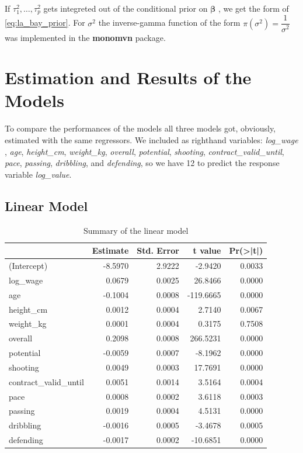 \documentclass[12pt,a4paper]{article}
\begin{document}
If \(\tau^2_1 , \ldots , \tau^2_p\) gets integreted out of the
conditional prior on \(\pmb{\beta}\) , we get the form of
\eqref{eq:la_bay_prior}. For \(\sigma^2\) the inverse-gamma function of
the form \(\pi \left( \sigma^2 \right) = \dfrac{1}{\sigma^2}\) was
implemented in the \textbf{monomvn} package.

\newpage

\hypertarget{estimation-and-results-of-the-models}{%
\section{Estimation and Results of the
Models}\label{estimation-and-results-of-the-models}}

To compare the performances of the models all three models got,
obviously, estimated with the same regressors. We included as righthand
variables: \emph{log\_wage} , \emph{age}, \emph{height\_cm},
\emph{weight\_kg}, \emph{overall}, \emph{potential}, \emph{shooting},
\emph{contract\_valid\_until}, \emph{pace}, \emph{passing},
\emph{dribbling}, and \emph{defending}, so we have 12 to predict the
response variable \emph{log\_value}.

\hypertarget{linear-model-1}{%
\subsection{Linear Model}\label{linear-model-1}}

\FloatBarrier
\begin{table}[!h]

\caption{\label{tab:structure and lm}\label{tab:sum_lm} Summary of the linear model}
\centering
\begin{tabular}[t]{lrrrr}
\toprule
  & Estimate & Std. Error & t value & Pr(>|t|)\\
\midrule
\rowcolor{gray!6}  (Intercept) & -8.5970 & 2.9222 & -2.9420 & 0.0033\\
log\_wage & 0.0679 & 0.0025 & 26.8466 & 0.0000\\
\rowcolor{gray!6}  age & -0.1004 & 0.0008 & -119.6665 & 0.0000\\
height\_cm & 0.0012 & 0.0004 & 2.7140 & 0.0067\\
\rowcolor{gray!6}  weight\_kg & 0.0001 & 0.0004 & 0.3175 & 0.7508\\
overall & 0.2098 & 0.0008 & 266.5231 & 0.0000\\
\rowcolor{gray!6}  potential & -0.0059 & 0.0007 & -8.1962 & 0.0000\\
shooting & 0.0049 & 0.0003 & 17.7691 & 0.0000\\
\rowcolor{gray!6}  contract\_valid\_until & 0.0051 & 0.0014 & 3.5164 & 0.0004\\
pace & 0.0008 & 0.0002 & 3.6118 & 0.0003\\
\rowcolor{gray!6}  passing & 0.0019 & 0.0004 & 4.5131 & 0.0000\\
dribbling & -0.0016 & 0.0005 & -3.4678 & 0.0005\\
\rowcolor{gray!6}  defending & -0.0017 & 0.0002 & -10.6851 & 0.0000\\
\bottomrule
\end{tabular}
\end{table}
\FloatBarrier
\end{document}
